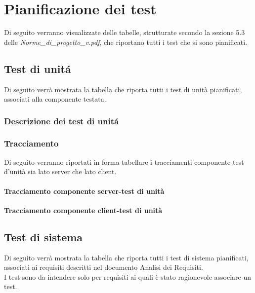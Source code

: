 \newpage
\section{Pianificazione dei test}
Di seguito verranno visualizzate delle tabelle, strutturate secondo la sezione 5.3 delle  \emph{Norme\_di\_progetto\_v\versioneNormeDiProgetto{}.pdf}, che riportano tutti i test che si sono pianificati. \\


\subsection{Test di unit\'{a}}
Di seguito verrà mostrata la tabella che riporta tutti i test di unità pianificati, associati alla componente testata.\\

\subsubsection{Descrizione dei test di unit\'{a}}




\subsubsection{Tracciamento}
Di seguito verranno riportati in forma tabellare i tracciamenti componente-test d'unità sia lato server che lato client.\\

\paragraph{Tracciamento componente server-test di unità}


\paragraph{Tracciamento componente client-test di unità}


\subsection{Test di sistema}
Di seguito verrà mostrata la tabella che riporta tutti i test di sistema pianificati, associati ai requisiti descritti nel documento Analisi dei Requisiti.\\
I test sono da intendere solo per requisiti ai quali è stato ragionevole associare un test.

